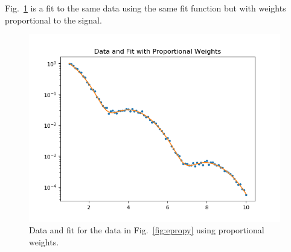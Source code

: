 \documentclass{scrartcl}
\begin{document}
Fig.~\ref{fig:dfpw} is a fit to the same data using the same
fit function but with weights proportional to the signal.
\begin{figure}
\begin{center}
\includegraphics[width=11cm]{dfpw}
\end{center}
\caption{\label{fig:dfpw}Data and fit for the data
in Fig.~\ref{fig:epropy} using proportional weights.}
\end{figure}
\end{document}

